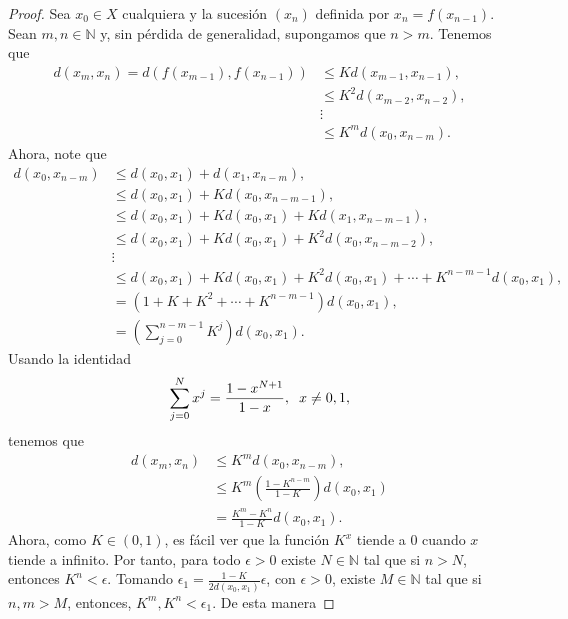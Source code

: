 \begin{itemize}[leftmargin=*]
    \begin{proof}
      Sea $x_0 \in X$ cualquiera y la sucesión $(x_n)$ definida por $x_n=f(x_{n-1})$. Sean $m,n \in \mathbb{N}$ y, sin pérdida de generalidad, supongamos
      que $n>m$. Tenemos que 
      \begin{align*}
          d(x_m,x_n)=d(f(x_{m-1}),f(x_{n-1}))&\leq Kd(x_{m-1},x_{n-1}),\\
          &\leq K^2d(x_{m-2},x_{n-2}),\\
          &\vdots\\
          &\leq K^md(x_0,x_{n-m}).
      \end{align*}
      Ahora, note que 
      \begin{align*}
          d(x_0,x_{n-m})&\leq d(x_0,x_1)+d(x_1,x_{n-m}),\\
          &\leq d(x_0,x_1)+Kd(x_0,x_{n-m-1}),\\
          &\leq d(x_0,x_1)+Kd(x_0,x_1)+Kd(x_1,x_{n-m-1}),\\
          &\leq d(x_0,x_1)+Kd(x_0,x_1)+K^2d(x_0,x_{n-m-2}),\\
          &\vdots\\
          &\leq d(x_0,x_1)+Kd(x_0,x_1)+K^2d(x_0,x_1)+\dotsb +K^{n-m-1}d(x_0,x_1),\\
          &=(1+K+K^2+\dotsb +K^{n-m-1})d(x_0,x_1),\\
          &=\left(\sum_{j=0}^{n-m-1} K^j\right)d(x_0,x_1).
      \end{align*}
      Usando la identidad 
      \begin{align*}
          \sum_{j=0}^{N} x^j=\frac{1-x^{N+1}}{1-x}, \hspace{2mm} x\neq 0,1,
      \end{align*}
      tenemos que
      \begin{align*}
          d(x_m,x_n)&\leq K^md(x_0,x_{n-m}),\\
          &\leq K^m\left(\frac{1-K^{n-m}}{1-K}\right)d(x_0,x_1)\\
          &=\frac{K^m-K^n}{1-K}d(x_0,x_1).
      \end{align*}
      Ahora, como $K \in (0,1)$, es fácil ver que la función $K^x$ tiende a $0$ cuando $x$ tiende a infinito. Por tanto, para todo $\epsilon>0$ existe $N \in \mathbb{N}$ tal que si $n>N$, entonces $K^n<\epsilon$. Tomando $ \displaystyle \epsilon_1=\frac{1-K}{2d(x_0,x_1)}\epsilon$, con $\epsilon>0$, existe $M \in \mathbb{N}$ tal que si $n,m >M$, entonces, $K^m,K^n<\epsilon_1$. De esta manera

\end{proof}
\end{itemize}
